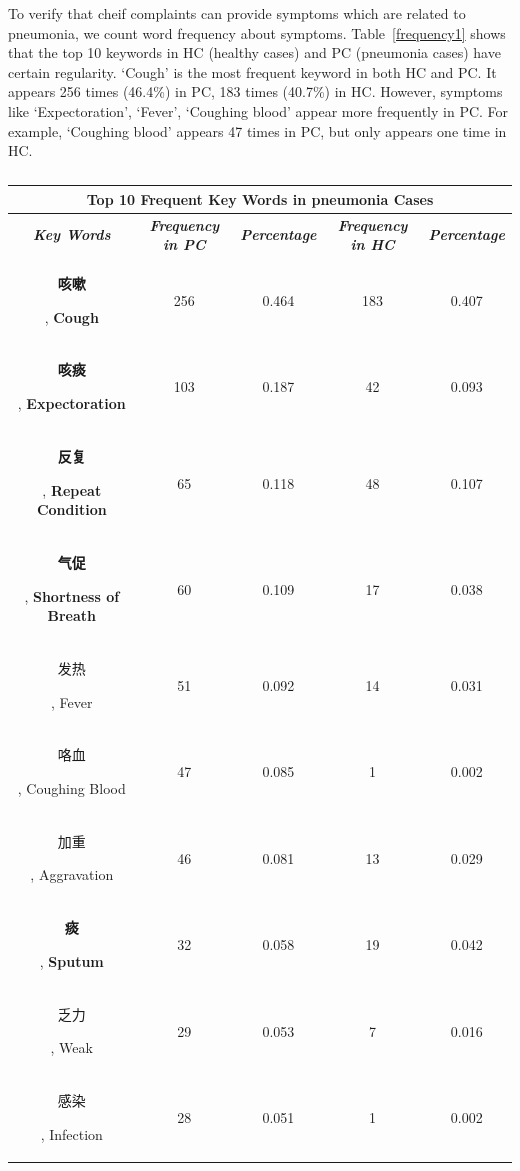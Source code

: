 \documentclass[journal]{IEEEtran}
\begin{document}
To verify that cheif complaints can provide symptoms which are related to pneumonia, we count word frequency about symptoms. Table~\ref{frequency1} shows that the top 10 keywords in HC (healthy cases) and PC (pneumonia cases) have certain regularity. `Cough' is the most frequent keyword in both HC and PC. It appears 256 times (46.4\%) in PC, 183 times (40.7\%) in HC. However, symptoms like `Expectoration', `Fever', `Coughing blood' appear more frequently in PC. For example, `Coughing blood' appears 47 times in PC, but only appears one time in HC. 
\begin{table}[htb]
    \vspace{-0cm}
\caption{}
\vspace{-0cm}
\begin{center}
\begin{tabular}{c|c|c|c|c}
\multicolumn{5}{c}{\textbf{Top 10 Frequent Key Words in pneumonia Cases}} \\
\hline
    \textbf{\textit{Key Words}} & \textbf{\textit{Frequency in PC}} & \textbf{\textit{Percentage}}& \textbf{\textit{Frequency in HC}}& \textbf{\textit{Percentage}} \\
\hline
\begin{CJK}{UTF8}{gbsn}\textbf{咳嗽}\end{CJK}, \textbf{Cough} & 256 & 0.464 & 183 & 0.407\\
\begin{CJK}{UTF8}{gbsn}\textbf{咳痰}\end{CJK}, \textbf{Expectoration} & 103 & 0.187 & 42 & 0.093\\
\begin{CJK}{UTF8}{gbsn}\textbf{反复}\end{CJK}, \textbf{Repeat Condition} & 65 & 0.118 & 48 & 0.107\\
\begin{CJK}{UTF8}{gbsn}\textbf{气促}\end{CJK}, \textbf{Shortness of Breath} & 60 & 0.109 & 17 & 0.038\\
\begin{CJK}{UTF8}{gbsn}发热\end{CJK}, Fever & 51 & 0.092 & 14 & 0.031\\
\begin{CJK}{UTF8}{gbsn}咯血\end{CJK}, Coughing Blood & 47 & 0.085 & 1 & 0.002\\
\begin{CJK}{UTF8}{gbsn}加重\end{CJK}, Aggravation & 46 & 0.081 & 13 & 0.029\\
\begin{CJK}{UTF8}{gbsn}\textbf{痰}\end{CJK}, \textbf{Sputum} & 32 & 0.058 & 19 & 0.042\\
\begin{CJK}{UTF8}{gbsn}乏力\end{CJK}, Weak& 29 & 0.053 & 7 & 0.016\\
\begin{CJK}{UTF8}{gbsn}感染\end{CJK}, Infection& 28 & 0.051 & 1 & 0.002\\



\end{tabular}
\end{center}
\end{table}
\end{document}
